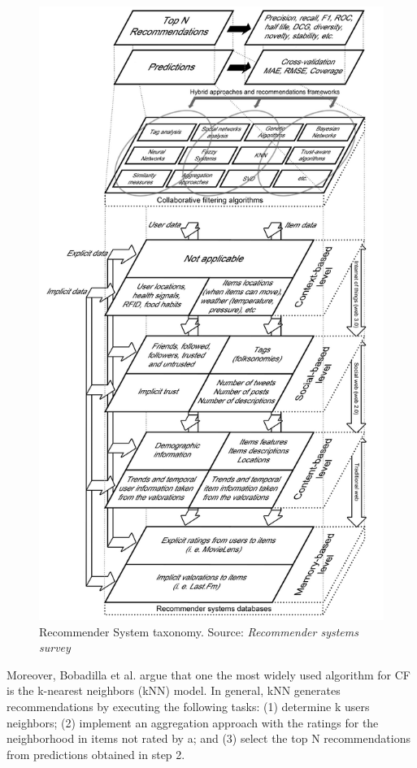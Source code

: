 \begin{figure}[t]
\centering
\includegraphics[scale=0.8]{images/taxonomyrs}
\caption[Recommender Systems taxonomy]{Recommender System taxonomy. Source: \textit{Recommender systems survey}\cite{bobadilla2013recommender}}
\label{fig:taxonomy}
\end{figure}

Moreover, Bobadilla et al. argue that one the most widely used algorithm for CF is the k-nearest neighbors (kNN) model. In general, kNN generates recommendations by executing the following tasks: (1) determine k users neighbors; (2) implement an aggregation approach with the ratings for the neighborhood in items not rated by a; and (3) select the top N recommendations from predictions obtained in step 2.

